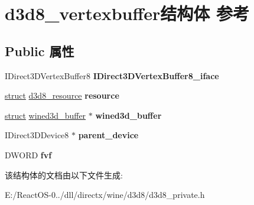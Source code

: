 \hypertarget{structd3d8__vertexbuffer}{}\section{d3d8\+\_\+vertexbuffer结构体 参考}
\label{structd3d8__vertexbuffer}
\subsection*{Public 属性}
\begin{DoxyCompactItemize}
\item 
\mbox{\label{structd3d8__vertexbuffer_a25782fc900ca3684e1be76221347d4f0}} 
I\+Direct3\+D\+Vertex\+Buffer8 {\bfseries I\+Direct3\+D\+Vertex\+Buffer8\+\_\+iface}
\item 
\mbox{\label{structd3d8__vertexbuffer_a33b7cac2b2f55351f76d7b6e7f4ff957}} 
\hyperlink{interfacestruct}{struct} \hyperlink{structd3d8__resource}{d3d8\+\_\+resource} {\bfseries resource}
\item 
\mbox{\label{structd3d8__vertexbuffer_a8de5c91d072717ee3d08288cf2a95884}} 
\hyperlink{interfacestruct}{struct} \hyperlink{structwined3d__buffer}{wined3d\+\_\+buffer} $\ast$ {\bfseries wined3d\+\_\+buffer}
\item 
\mbox{\label{structd3d8__vertexbuffer_ab3b63f024723981a082dc09500d080f4}} 
I\+Direct3\+D\+Device8 $\ast$ {\bfseries parent\+\_\+device}
\item 
\mbox{\label{structd3d8__vertexbuffer_aec947a5e284f0c2fedd22344d7b06836}} 
D\+W\+O\+RD {\bfseries fvf}
\end{DoxyCompactItemize}


该结构体的文档由以下文件生成\+:\begin{DoxyCompactItemize}
\item 
E\+:/\+React\+O\+S-\/0../dll/directx/wine/d3d8/d3d8\+\_\+private.\+h\end{DoxyCompactItemize}
